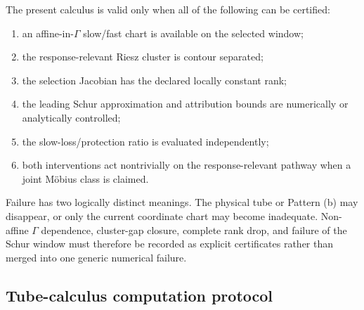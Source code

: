 \documentclass[11pt]{article}
\theoremstyle{definition}
\theoremstyle{remark}
\begin{document}
The present calculus is valid only when all of the following can be certified:
\begin{enumerate}
  \item an affine-in-$\Gamma$ slow/fast chart is available on the selected window;
  \item the response-relevant Riesz cluster is contour separated;
  \item the selection Jacobian has the declared locally constant rank;
  \item the leading Schur approximation and attribution bounds are numerically or analytically controlled;
  \item the slow-loss/protection ratio is evaluated independently;
  \item both interventions act nontrivially on the response-relevant pathway when a joint M\"obius class is claimed.
\end{enumerate}
Failure has two logically distinct meanings. The physical tube or Pattern (b) may disappear, or only the current coordinate chart may become inadequate. Non-affine $\Gamma$ dependence, cluster-gap closure, complete rank drop, and failure of the Schur window must therefore be recorded as explicit certificates rather than merged into one generic numerical failure.

\subsection{Tube-calculus computation protocol}
\end{document}

